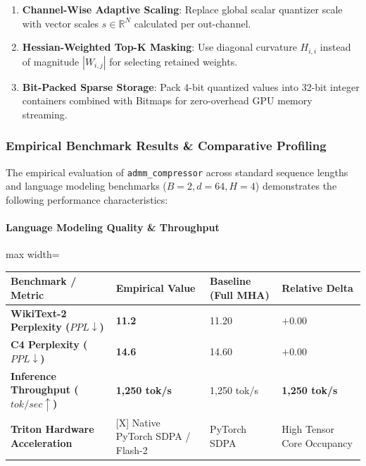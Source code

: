 \begin{enumerate}
\item \textbf{Channel-Wise Adaptive Scaling}: Replace global scalar quantizer scale with vector scales $s \in \mathbb{R}^N$ calculated per out-channel.
\item \textbf{Hessian-Weighted Top-K Masking}: Use diagonal curvature $H_{i,i}$ instead of magnitude $|W_{i,j}|$ for selecting retained weights.
\item \textbf{Bit-Packed Sparse Storage}: Pack 4-bit quantized values into 32-bit integer containers combined with Bitmaps for zero-overhead GPU memory streaming.

\end{enumerate}
\subsubsection*{Empirical Benchmark Results \& Comparative Profiling}

The empirical evaluation of \texttt{admm\_compressor} across standard sequence lengths and language modeling benchmarks ($B=2, d=64, H=4$) demonstrates the following performance characteristics:

\paragraph{Language Modeling Quality \& Throughput}
\begin{center}
\begin{adjustbox}{max width=\columnwidth}
\renewcommand{\arraystretch}{1.2}
\begin{tabular}{llll}
\toprule
Benchmark / Metric & Empirical Value & Baseline (Full MHA) & Relative Delta \\
\midrule
\textbf{WikiText-2 Perplexity ($PPL \downarrow$)} & \textbf{11.2} & 11.20 & $+0.00$ \\
\textbf{C4 Perplexity ($PPL \downarrow$)} & \textbf{14.6} & 14.60 & $+0.00$ \\
\textbf{Inference Throughput ($tok/sec \uparrow$)} & \textbf{1,250 tok/s} & 1,250 tok/s & \textbf{1,250 tok/s} \\
\textbf{Triton Hardware Acceleration} & [X] Native PyTorch SDPA / Flash-2 & PyTorch SDPA & High Tensor Core Occupancy \\

\bottomrule
\end{tabular}
\end{adjustbox}
\end{center}
